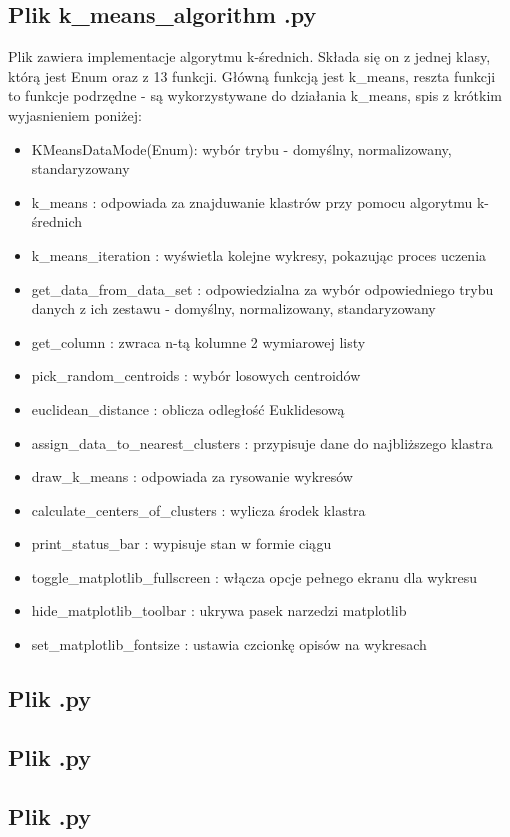 \documentclass{classrep}
\begin{document}
{	\subsection{Plik k\_means\_algorithm .py}
	{
		Plik zawiera implementacje algorytmu k-średnich. Składa się on z jednej klasy, którą jest Enum oraz z 13 funkcji. Główną funkcją jest k\_means, reszta funkcji to funkcje podrzędne - są wykorzystywane do działania k\_means, spis z krótkim wyjasnieniem poniżej: 
	\begin{itemize}
		\item KMeansDataMode(Enum): wybór trybu - domyślny, normalizowany, standaryzowany
		\item k\_means : odpowiada za znajduwanie klastrów przy pomocu algorytmu k-średnich
		\item k\_means\_iteration : wyświetla kolejne wykresy, pokazując proces uczenia
		\item get\_data\_from\_data\_set : odpowiedzialna za wybór odpowiedniego trybu danych z ich zestawu - domyślny, normalizowany, standaryzowany
		\item get\_column : zwraca n-tą kolumne 2 wymiarowej listy
		\item pick\_random\_centroids : wybór losowych centroidów
		\item euclidean\_distance : oblicza odległość Euklidesową
		\item assign\_data\_to\_nearest\_clusters : przypisuje dane do najbliższego klastra
		\item draw\_k\_means : odpowiada za rysowanie wykresów
		\item calculate\_centers\_of\_clusters : wylicza środek klastra
		\item print\_status\_bar : wypisuje stan w formie ciągu
		\item toggle\_matplotlib\_fullscreen : włącza opcje pełnego ekranu dla wykresu
		\item hide\_matplotlib\_toolbar : ukrywa pasek narzedzi matplotlib
		\item set\_matplotlib\_fontsize : ustawia czcionkę opisów na wykresach
	\end{itemize}
	}
	\subsection{Plik  .py}
	{

	}
	\subsection{Plik  .py}
	{

	}
	\subsection{Plik  .py}
	{

	}
}
\end{document}
